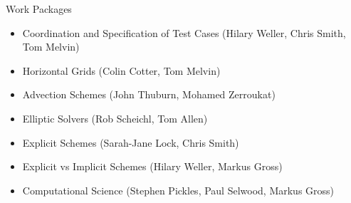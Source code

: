 \begin{slide}{Work Packages}

\begin{itemize}

\item Coordination and Specification of Test Cases (Hilary Weller, Chris Smith, Tom Melvin)

\item Horizontal Grids (Colin Cotter, Tom Melvin)

\item Advection Schemes (John Thuburn, Mohamed Zerroukat)

\item Elliptic Solvers (Rob Scheichl, Tom Allen)

\item Explicit Schemes (Sarah-Jane Lock, Chris Smith)

\item Explicit vs Implicit Schemes (Hilary Weller, Markus Gross)

\item Computational Science (Stephen Pickles, Paul Selwood, Markus Gross)

\end{itemize}

\end{slide}
